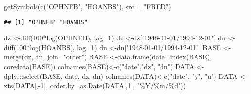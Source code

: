 \documentclass[
]{book}
\newenvironment{Shaded}{\begin{snugshade}}{\end{snugshade}}
\newcommand{\AttributeTok}[1]{\textcolor[rgb]{0.77,0.63,0.00}{#1}}
\newcommand{\DecValTok}[1]{\textcolor[rgb]{0.00,0.00,0.81}{#1}}
\newcommand{\FunctionTok}[1]{\textcolor[rgb]{0.00,0.00,0.00}{#1}}
\newcommand{\NormalTok}[1]{#1}
\newcommand{\OtherTok}[1]{\textcolor[rgb]{0.56,0.35,0.01}{#1}}
\newcommand{\SpecialCharTok}[1]{\textcolor[rgb]{0.00,0.00,0.00}{#1}}
\newcommand{\StringTok}[1]{\textcolor[rgb]{0.31,0.60,0.02}{#1}}
\begin{document}
\begin{Shaded}
\begin{Highlighting}[]
\FunctionTok{getSymbols}\NormalTok{(}\FunctionTok{c}\NormalTok{(}\StringTok{"OPHNFB"}\NormalTok{, }\StringTok{"HOANBS"}\NormalTok{),}
           \AttributeTok{src =} \StringTok{"FRED"}\NormalTok{)}
\end{Highlighting}
\end{Shaded}

\begin{verbatim}
## [1] "OPHNFB" "HOANBS"
\end{verbatim}

\begin{Shaded}
\begin{Highlighting}[]
\NormalTok{dz         }\OtherTok{\textless{}{-}}\FunctionTok{diff}\NormalTok{(}\DecValTok{100}\SpecialCharTok{*}\FunctionTok{log}\NormalTok{(OPHNFB), }\AttributeTok{lag=}\DecValTok{1}\NormalTok{)}
\NormalTok{dz         }\OtherTok{\textless{}{-}}\NormalTok{dz[}\StringTok{"1948{-}01{-}01/1994{-}12{-}01"}\NormalTok{]  }
\NormalTok{dn         }\OtherTok{\textless{}{-}}\FunctionTok{diff}\NormalTok{(}\DecValTok{100}\SpecialCharTok{*}\FunctionTok{log}\NormalTok{(HOANBS), }\AttributeTok{lag=}\DecValTok{1}\NormalTok{)}
\NormalTok{dn         }\OtherTok{\textless{}{-}}\NormalTok{dn[}\StringTok{"1948{-}01{-}01/1994{-}12{-}01"}\NormalTok{]  }
\NormalTok{BASE       }\OtherTok{\textless{}{-}}\FunctionTok{merge}\NormalTok{(dz, dn, }\AttributeTok{join=}\StringTok{"outer"}\NormalTok{)}
\NormalTok{BASE       }\OtherTok{\textless{}{-}}\FunctionTok{data.frame}\NormalTok{(}\AttributeTok{date=}\FunctionTok{index}\NormalTok{(BASE), }\FunctionTok{coredata}\NormalTok{(BASE))}
\FunctionTok{colnames}\NormalTok{(BASE)}\OtherTok{\textless{}{-}}\FunctionTok{c}\NormalTok{(}\StringTok{"date"}\NormalTok{,}\StringTok{"dz"}\NormalTok{, }\StringTok{"dn"}\NormalTok{)}
\NormalTok{DATA    }\OtherTok{\textless{}{-}}\NormalTok{dplyr}\SpecialCharTok{::}\FunctionTok{select}\NormalTok{(BASE, date, dz, dn)}
\FunctionTok{colnames}\NormalTok{(DATA)}\OtherTok{\textless{}{-}}\FunctionTok{c}\NormalTok{(}\StringTok{"date"}\NormalTok{, }\StringTok{"y"}\NormalTok{, }\StringTok{"u"}\NormalTok{)}
\NormalTok{DATA    }\OtherTok{\textless{}{-}} \FunctionTok{xts}\NormalTok{(DATA[,}\SpecialCharTok{{-}}\DecValTok{1}\NormalTok{], }\AttributeTok{order.by=}\FunctionTok{as.Date}\NormalTok{(DATA[,}\DecValTok{1}\NormalTok{], }\StringTok{"\%Y/\%m/\%d"}\NormalTok{))}
\end{Highlighting}
\end{Shaded}
\end{document}
